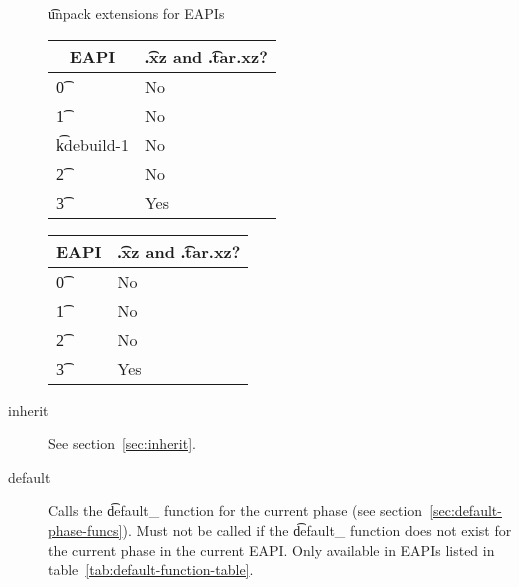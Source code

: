 \begin{description}
\begin{centertable}{\t{unpack} extensions for EAPIs} \label{tab:unpack-extensions-table}
\IFKDEBUILDELSE
{
    \begin{tabular}{ l l }
        \toprule
            \multicolumn{1}{c}{\textbf{EAPI}} &
            \multicolumn{1}{c}{\textbf{\t{.xz} and \t{.tar.xz}?}} \\
            \midrule
    \t{0} & No \\
    \t{1} & No \\
    \t{kdebuild-1} & No \\
    \t{2} & No \\
    \t{3} & Yes \\
    \bottomrule
    \end{tabular}
}{
    \begin{tabular}{ l l }
        \toprule
            \multicolumn{1}{c}{\textbf{EAPI}} &
            \multicolumn{1}{c}{\textbf{\t{.xz} and \t{.tar.xz}?}} \\
            \midrule
    \t{0} & No \\
    \t{1} & No \\
    \t{2} & No \\
    \t{3} & Yes \\
    \bottomrule
    \end{tabular}
}
\end{centertable}

\item[inherit] See section~\ref{sec:inherit}.

\item[default]
     Calls the \t{default\_} function for the current phase (see
    section~\ref{sec:default-phase-funcs}).  Must not be called if the \t{default\_} function
    does not exist for the current phase in the current EAPI.  Only available in EAPIs listed in
    table~\ref{tab:default-function-table}.
\end{description}

